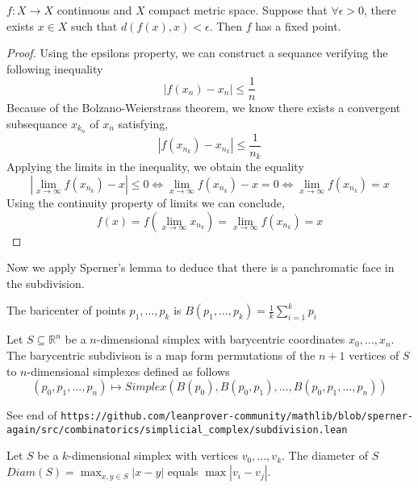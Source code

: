 \begin{lemma}
\label{arbitrary_almost_fixed_points_implies_fixed_point}
$f\colon X \to X$ continuous and $X$ compact metric space. Suppose that $\forall \epsilon >0$, there exists $x\in X$ such that $d(f(x),x) < \epsilon$. Then $f$ has a fixed point.
\end{lemma}
\begin{proof}
Using the epsilons property, we can construct a sequance verifying the following inequality
$$\left|f(x_n)-x_n\right|\leq\frac{1}{n}$$
Because of the Bolzano-Weierstrass theorem, we know there exists a convergent subsequance $ x_ {k_n} $ of $ x_n $ satisfying,
$$\left|f(x_{n_k})-x_{n_k}\right|\leq\frac{1}{n_k}$$
Applying the limits in the inequality, we obtain the equality
$$\left|\lim_{x\to \infty} f(x_{n_k})-x\right|\leq0\Longleftrightarrow \lim_{x\to \infty} f(x_{n_k})-x = 0\Longleftrightarrow \lim_{x\to \infty} f(x_{n_k}) = x$$
Using the continuity property of limits we can conclude,
$$f(x)=f\left(\lim_{x\to \infty} x_{n_k}\right)=\lim_{x\to \infty} f(x_{n_k})=x$$
$ $
\end{proof}

Now we apply Sperner's lemma to deduce that there is a panchromatic face in the subdivision.

\begin{definition}
\label{barycenter}
The baricenter of points $p_1, \dots, p_k$ is $B(p_1, \dots, p_k)= \frac{1}{k}\sum_{i=1}^k p_i$
\end{definition}

\begin{definition}
\label{barycentric_subdivision}
Let $S\subseteq \mathbb{R}^n$ be a $n$-dimensional simplex with barycentric coordinates $x_0,\ldots,x_n$. The barycentric subdivison is a map form permutations of the $n+1$ vertices of $S$ to $n$-dimensional simplexes defined as follows
\[
(p_0, p_1, \dots, p_n) \mapsto Simplex(B(p_0), B(p_0,p_1), \dots, B(p_0,p_1,\dots, p_n))
\]

See end of \verb|https://github.com/leanprover-community/mathlib/blob/sperner-again/src/combinatorics/simplicial_complex/subdivision.lean|
\end{definition}

\begin{lemma}
  \label{diameter_simplex_is_longest_edge}
  Let $S$ be a $k$-dimensional simplex with vertices $v_0, \dots,  v_k$. The diameter of $S$ 
   $ Diam(S)= \max_{x,y\in S} |x-y|$ equals $\max |v_i - v_j|$.
\end{lemma}

